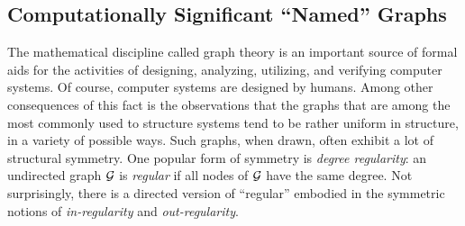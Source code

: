 \subsection{Computationally Significant ``Named'' Graphs}
\label{sec:graphs-important-families}

The mathematical discipline called graph theory is an important source
of formal aids for the activities of designing, analyzing, utilizing,
and verifying computer systems.  Of course, computer systems are
designed by humans.  Among other consequences of this fact is the
observations that the graphs that are among the most commonly used to
structure systems tend to be rather uniform in structure, in a variety
of possible ways.  Such graphs, when drawn, often exhibit a lot of
structural symmetry.  One popular form of symmetry is {\it degree
  regularity}: an undirected graph $\mbox{$\cal G$}$ is {\it regular}
 if all nodes of $\mbox{$\cal G$}$ have the same degree.  Not
surprisingly, there is a directed version of ``regular'' embodied in the
symmetric notions of {\it in-regularity}
 and {\it out-regularity}.

\medskip

